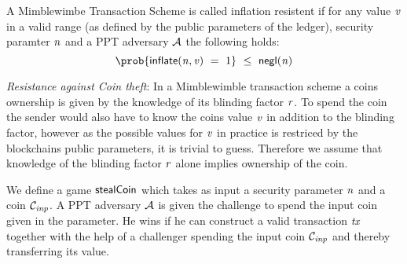 \begin{center}
\end{center}

\begin{definition} \label{def:atom:inflation-resistence}
    A Mimblewimbe Transaction Scheme is called inflation resistent if for any value $\mathit{v}$ in a valid range (as defined by the public parameters of the ledger), security
    paramter $\mathit{n}$ and a PPT adversary $\mathcal{A}$ the following holds:
    \[ \prob{\procInflate{\varN}{\varValue} \opEqNoQ 1} \opSmEq \funNegl{\varN} \]
\end{definition}

\emph{Resistance against Coin theft}: In a Mimblewimble transaction scheme a coins ownership is given by the knowledge of its blinding factor $\mathit{r}$. To spend the coin the sender would also have to know the coins value $\mathit{v}$ in addition
to the blinding factor, however as the possible values for $\mathit{v}$ in practice is restriced by the blockchains public parameters, it is trivial to guess.
Therefore we assume that knowledge of the blinding factor $\mathit{r}$ alone implies ownership of the coin.

We define a game $\mathsf{stealCoin}$ which takes as input a security parameter $\mathit{n}$ and a coin $\mathcal{C}_{\mathit{inp}}$. A PPT adversary $\mathcal{A}$ is given the challenge to spend the input coin given in the parameter.
He wins if he can construct a valid transaction $\mathit{tx}$ together with the help of a challenger spending the input coin $\mathcal{C}_{\mathit{inp}}$ and thereby transferring its value.


